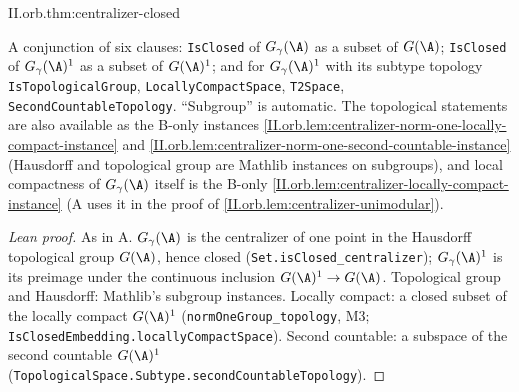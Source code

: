 \begin{theorem}[closedness]
\end{theorem}
\begin{tfformal}{II.orb.thm:centralizer-closed}
\begin{tffidelity}
A conjunction of six clauses: \texttt{IsClosed} of $G_\gamma(\A)$ as a subset of $G(\A)$; \texttt{IsClosed} of $G_\gamma(\A)^1$ as a subset of $G(\A)^1$; and for $G_\gamma(\A)^1$ with its subtype topology \texttt{IsTopologicalGroup}, \texttt{LocallyCompactSpace}, \texttt{T2Space}, \texttt{SecondCountableTopology}. ``Subgroup'' is automatic. The topological statements are also available as the B-only instances \cref{II.orb.lem:centralizer-norm-one-locally-compact-instance} and \cref{II.orb.lem:centralizer-norm-one-second-countable-instance} (Hausdorff and topological group are Mathlib instances on subgroups), and local compactness of $G_\gamma(\A)$ itself is the B-only \cref{II.orb.lem:centralizer-locally-compact-instance} (A uses it in the proof of \cref{II.orb.lem:centralizer-unimodular}).
\end{tffidelity}
\end{tfformal}
\begin{proof}[Lean proof]
As in A. $G_\gamma(\A)$ is the centralizer of one point in the Hausdorff topological group $G(\A)$, hence closed (\texttt{Set.isClosed\_centralizer}); $G_\gamma(\A)^1$ is its preimage under the continuous inclusion $G(\A)^1\to G(\A)$. Topological group and Hausdorff: Mathlib's subgroup instances. Locally compact: a closed subset of the locally compact $G(\A)^1$ (\texttt{normOneGroup\_topology}, M3; \texttt{IsClosedEmbedding.locallyCompactSpace}). Second countable: a subspace of the second countable $G(\A)^1$ (\texttt{TopologicalSpace.Subtype.secondCountableTopology}).
\end{proof}

